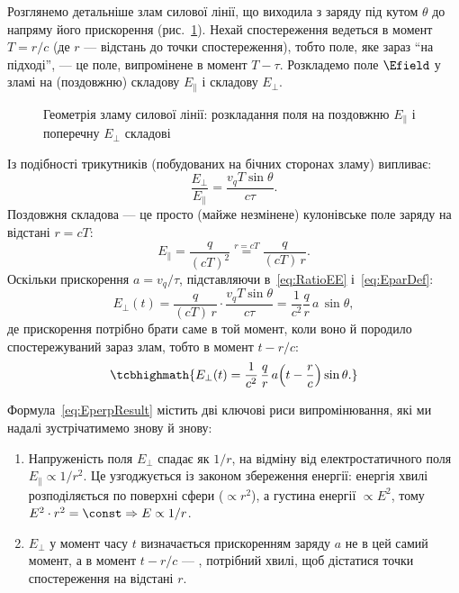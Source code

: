 Розглянемо детальніше злам силової лінії, що виходила з заряду під кутом $\theta$ до напряму його прискорення (рис.~\ref{pic:ElementaryDerivation}).
Нехай спостереження ведеться в момент $T=r/c$ (де $r$ --- відстань до точки спостереження), тобто поле, яке зараз \enquote{на підході}, --- це
поле, випромінене в момент $T-\tau$. Розкладемо поле $\Efield$ у зламі на  (поздовжню) складову $E_\parallel$ і
 складову $E_\perp$.

\begin{figure}[h!]\centering
	\caption{Геометрія зламу силової лінії: розкладання поля на поздовжню $E_\parallel$ і
		поперечну $E_\perp$ складові\label{pic:ElementaryDerivation}}
\end{figure}

Із подібності трикутників (побудованих на бічних сторонах зламу) випливає:
\begin{equation}\label{eq:RatioEE}
	\frac{E_\perp}{E_\parallel} = \frac{v_qT\sin\theta}{c\tau}.
\end{equation}
Поздовжня складова --- це просто (майже незмінене) кулонівське поле заряду на відстані $r=cT$:
\begin{equation}\label{eq:EparDef}
	E_\parallel = \frac{q}{(cT)^2} \stackrel{r=cT}{=} \frac{q}{(cT)\,r}.
\end{equation}
Оскільки прискорення $a=v_q/\tau$, підставляючи в~\eqref{eq:RatioEE} і~\eqref{eq:EparDef}:
\begin{equation}\label{eq:EperpDerivation}
	E_\perp(t) = \frac{q}{(cT)\,r}\cdot\frac{v_qT\sin\theta}{c\tau} = \frac1{c^2}\frac{q}{r}\, a\,\sin\theta,
\end{equation}
де прискорення потрібно брати саме в той момент, коли воно й породило спостережуваний зараз злам, тобто в момент $t-r/c$:
\begin{equation}\label{eq:EperpResult}
	\tcbhighmath{
		E_\perp(t) = \frac1{c^2}\,\frac{q}{r}\, a\!\left(t-\frac{r}{c}\right)\sin\theta.
	}
\end{equation}

\begin{Attention}
	Формула~\eqref{eq:EperpResult} містить дві ключові риси  випромінювання, які ми надалі зустрічатимемо знову й знову:
	\begin{enumerate}
		\item Напруженість поля  $E_\perp$ спадає як $1/r$, на відміну від електростатичного поля $E_\parallel\propto1/r^2$. Це
		      узгоджується із законом збереження енергії: енергія хвилі розподіляється по поверхні сфери ($\propto r^2$), а густина енергії
		      $\propto E^2$, тому $E^2\cdot r^2 = \const \Rightarrow E\propto1/r$.
		\item $E_\perp$ у момент часу $t$ визначається прискоренням заряду $a$ не в цей самий момент, а в  момент $t-r/c$
		      --- , потрібний хвилі, щоб дістатися точки спостереження на відстані $r$.
	\end{enumerate}
\end{Attention}

